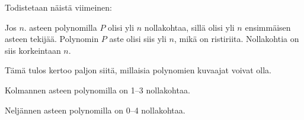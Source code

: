 Todistetaan näistä viimeinen:

\begin{todistus}
Jos $n$. asteen polynomilla $P$ olisi yli $n$ nollakohtaa, sillä olisi yli $n$ ensimmäisen asteen
tekijää. Polynomin $P$ aste olisi siis yli $n$, mikä on ristiriita. Nollakohtia on siis
korkeintaan $n$.
\end{todistus}

Tämä tulos kertoo paljon siitä, millaisia polynomien kuvaajat voivat olla.

\begin{esimerkki} Kolmannen asteen polynomilla on 1--3 nollakohtaa.

\begin{lukusuora}{-2.5}{3}{3.6}
\lukusuoraisobbox
{}
\end{lukusuora}
\begin{lukusuora}{-2.8}{2.5}{3.6}
\lukusuoraisobbox
{}
\end{lukusuora}
\begin{lukusuora}{-2}{2}{3.6}
\lukusuoraisobbox
{}
\end{lukusuora}

\end{esimerkki}


\begin{esimerkki} Neljännen asteen polynomilla on 0--4 nollakohtaa.

\begin{lukusuora}{-4}{4}{3.6}
\end{lukusuora}
\begin{lukusuora}{-4}{4}{3.6}
\end{lukusuora}
\begin{lukusuora}{-4}{4}{3.6}
\end{lukusuora}

\begin{lukusuora}{-4}{4}{3.6}
\end{lukusuora}
\begin{lukusuora}{-2.8}{2.8}{3.6}
\end{lukusuora}

\end{esimerkki}

